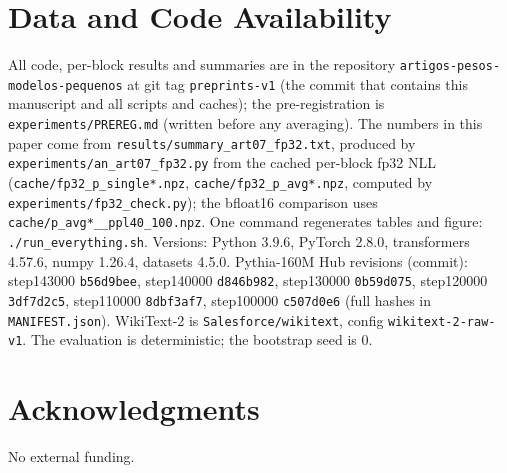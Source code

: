\documentclass[conference]{IEEEtran}
\begin{document}
\section*{Data and Code Availability}
All code, per-block results and summaries are in the repository \texttt{artigos-pesos-modelos-pequenos} at git tag \texttt{preprints-v1} (the commit that contains this manuscript and all scripts and caches); the pre-registration is \texttt{experiments/PREREG.md} (written before any averaging). The numbers in this paper come from \texttt{results/summary\_art07\_fp32.txt}, produced by \texttt{experiments/an\_art07\_fp32.py} from the cached per-block fp32 NLL (\texttt{cache/fp32\_p\_single*.npz}, \texttt{cache/fp32\_p\_avg*.npz}, computed by \texttt{experiments/fp32\_check.py}); the bfloat16 comparison uses \texttt{cache/p\_avg*\_\_ppl40\_100.npz}. One command regenerates tables and figure: \texttt{./run\_everything.sh}. Versions: Python 3.9.6, PyTorch 2.8.0, transformers 4.57.6, numpy 1.26.4, datasets 4.5.0. Pythia-160M Hub revisions (commit): step143000 \texttt{b56d9bee}, step140000 \texttt{d846b982}, step130000 \texttt{0b59d075}, step120000 \texttt{3df7d2c5}, step110000 \texttt{8dbf3af7}, step100000 \texttt{c507d0e6} (full hashes in \texttt{MANIFEST.json}). WikiText-2 is \texttt{Salesforce/wikitext}, config \texttt{wikitext-2-raw-v1}. The evaluation is deterministic; the bootstrap seed is 0.

\section*{Acknowledgments}
No external funding.
\end{document}
